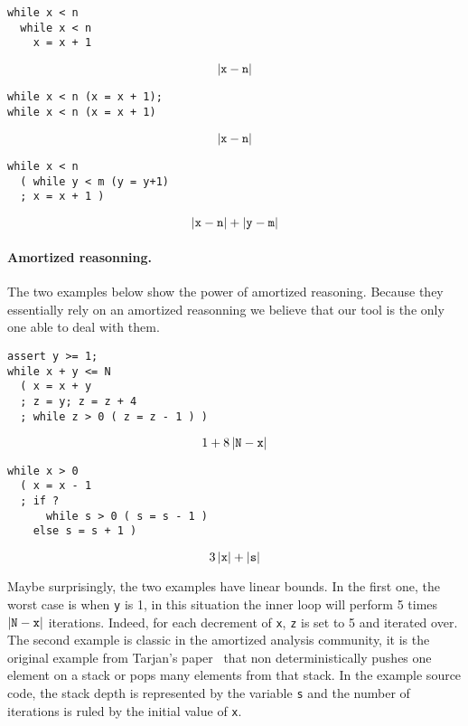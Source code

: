 \documentclass[10pt]{article}
\begin{document}
\begin{minipage}[b]{0.30\textwidth}
\begin{lstlisting}
while x < n
  while x < n
    x = x + 1
\end{lstlisting}
$$
|{\tt x} - {\tt n}|
$$
\end{minipage}
\begin{minipage}[b]{0.30\textwidth}
\begin{lstlisting}
while x < n (x = x + 1);
while x < n (x = x + 1)
\end{lstlisting}
$$
|{\tt x} - {\tt n}|
$$
\end{minipage}
\begin{minipage}[b]{0.30\textwidth}
\begin{lstlisting}
while x < n
  ( while y < m (y = y+1)
  ; x = x + 1 )
\end{lstlisting}
$$
|{\tt x} - {\tt n}|
+|{\tt y} - {\tt m}|
$$
\end{minipage}

\paragraph{Amortized reasonning.}
The two examples below show the power of amortized reasoning.
Because they essentially rely on an amortized reasonning we believe
that our tool is the only one able to deal with them.

\begin{minipage}[b]{0.45\textwidth}
\begin{lstlisting}
assert y >= 1;
while x + y <= N
  ( x = x + y
  ; z = y; z = z + 4
  ; while z > 0 ( z = z - 1 ) )
\end{lstlisting}
$$
1 + 8\,|{\tt N} - {\tt x}|
$$
\end{minipage}
\begin{minipage}[b]{0.45\textwidth}
\begin{lstlisting}
while x > 0
  ( x = x - 1
  ; if ?
      while s > 0 ( s = s - 1 )
    else s = s + 1 )
\end{lstlisting}
$$
3\,|{\tt x}| + |{\tt s}|
$$
\end{minipage}

\hspace{1ex}

Maybe surprisingly, the two examples have linear bounds.  In the first one, the
worst case is when {\tt y} is 1, in this situation the inner loop will perform 5 times
$|{\tt N} - {\tt x}|$ iterations. Indeed, for each decrement of {\tt x}, {\tt z} is set
to 5 and iterated over.  The second example is classic in the amortized analysis
community, it is the original example from Tarjan's paper~\cite{Tarjan-amort} that
non deterministically pushes one element on a stack or pops many elements from
that stack.  In the example source code, the stack depth is represented by the
variable {\tt s} and the number of iterations is ruled by the initial value of {\tt x}.
\end{document}
